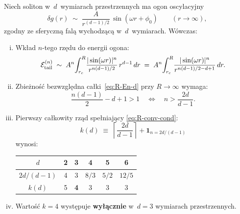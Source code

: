 \begin{proposition}[Wyk\l{}adnik masowy z~zbie\.zno\'sci ogona w~$d = 3$]%
\label{prop:R-k4-dimensional}

\noindent
Niech soliton w~$d$~wymiarach przestrzennych ma ogon oscylacyjny
\begin{equation}\label{eq:R-tail-d}
  \delta g(r) \;\sim\; \frac{A}{r^{(d-1)/2}}\,\sin(\omega r + \phi_0)
  \qquad (r \to \infty),
\end{equation}
zgodny ze sferyczn\k{a} fal\k{a} wychodz\k{a}c\k{a}
w~$d$~wymiarach. W\'owczas:

\begin{enumerate}[(i)]
  \item Wk\l{}ad $n$-tego rz\k{e}du do energii ogona:
    \begin{equation}\label{eq:R-En-d}
      \mathcal{E}_{\rm tail}^{(n)}
      \;\sim\; A^n \!\int_{r_c}^{R}\!
      \frac{|\sin(\omega r)|^n}{r^{n(d-1)/2}}\,r^{d-1}\,dr
      \;=\; A^n \!\int_{r_c}^{R}\!
      \frac{|\sin(\omega r)|^n}{r^{n(d-1)/2 - d + 1}}\,dr.
    \end{equation}

  \item Zbie\.zno\'s\'c bezwzgl\k{e}dna ca\l{}ki~\eqref{eq:R-En-d}
    przy $R \to \infty$ wymaga:
    \begin{equation}\label{eq:R-conv-cond}
      \frac{n(d-1)}{2} - d + 1 > 1
      \quad\Longleftrightarrow\quad
      n > \frac{2d}{d - 1}.
    \end{equation}

  \item Pierwszy ca\l{}kowity rz\k{a}d spe\l{}niaj\k{a}cy
    \eqref{eq:R-conv-cond}:
    \begin{equation}\label{eq:R-k-crit}
      k(d) \;\equiv\;
      \left\lceil \frac{2d}{d - 1} \right\rceil + \mathbf{1}_{n = 2d/(d-1)}
    \end{equation}
    wynosi:
    \begin{center}
    \begin{tabular}{c|ccccc}
      $d$ & 2 & \textbf{3} & 4 & 5 & 6 \\
      \hline
      $2d/(d-1)$ & 4 & 3 & $8/3$ & $5/2$ & $12/5$ \\
      $k(d)$ & 5 & \textbf{4} & 3 & 3 & 3 \\
    \end{tabular}
    \end{center}

  \item Warto\'s\'c $k = 4$ wyst\k{e}puje \textbf{wy\l{}\k{a}cznie}
    w~$d = 3$ wymiarach przestrzennych.
\end{enumerate}
\end{proposition}

